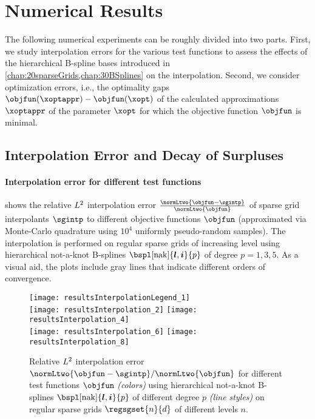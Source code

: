 \section{Numerical Results}
\label{sec:54results}

The following numerical experiments can be roughly divided into two parts.
First, we study interpolation errors for the various test functions
to assess the effects of the hierarchical B-spline bases introduced in
\cref{chap:20sparseGrids,chap:30BSplines} on the interpolation.
Second, we consider optimization errors, i.e.,
the optimality gaps $\objfun(\xoptappr) - \objfun(\xopt)$
of the calculated approximations $\xoptappr$
of the parameter $\xopt$ for which the objective function $\objfun$
is minimal.



\subsection{Interpolation Error and Decay of Surpluses}
\label{sec:541interpolation}

\paragraph{Interpolation error for different test functions}

 shows the
relative $L^2$ interpolation error
$\tfrac{\normLtwo{\objfun - \sgintp}}{\normLtwo{\objfun}}$
of sparse grid interpolants $\sgintp$ to
different objective functions $\objfun$
(approximated via Monte-Carlo quadrature using
$10^4$ uniformly pseudo-random samples).
The interpolation is performed on regular sparse grids of increasing level
using hierarchical not-a-knot B-splines $\bspl[\nak]{\*l,\*i}{p}$
of degree $p = 1, 3, 5$.
As a visual aid, the plots include gray lines that indicate different
orders of convergence.

\begin{figure}
  \texttt{[image: resultsInterpolationLegend\_1]}\\[2mm]%
  \texttt{[image: resultsInterpolation\_2]}%
  \hfill%
  \texttt{[image: resultsInterpolation\_4]}%
  \\[2mm]%
  \texttt{[image: resultsInterpolation\_6]}%
  \hfill%
  \texttt{[image: resultsInterpolation\_8]}%
  \caption[Relative interpolation error for different test functions]{%
    Relative $L^2$ interpolation error
    $\normLtwo{\objfun - \sgintp}/\normLtwo{\objfun}$
    for different test functions $\objfun$ \emph{(colors)}
    using hierarchical not-a-knot B-splines
    $\bspl[\nak]{\*l,\*i}{p}$ of different degree $p$ \emph{(line styles)} on
    regular sparse grids $\regsgset{n}{d}$ of different levels $n$.%
  }%
  \label{fig:resultsInterpolationErrorTestFunctions}%
\end{figure}

